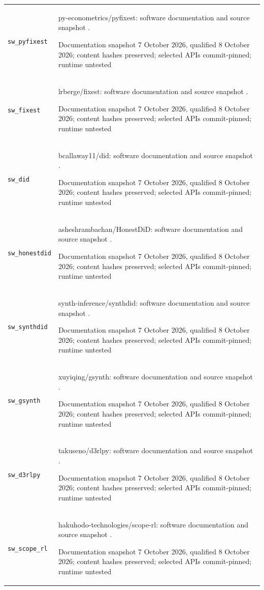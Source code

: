 \begin{longtable}{P{32mm}P{112mm}}
{\scriptsize\texttt{sw\_pyfixest}} & py-econometrics/pyfixest: software documentation and source snapshot \citep{sw_pyfixest}.\par Documentation snapshot 7 October 2026, qualified 8 October 2026; content hashes preserved; selected APIs commit-pinned; runtime untested\\
{\scriptsize\texttt{sw\_fixest}} & lrberge/fixest: software documentation and source snapshot \citep{sw_fixest}.\par Documentation snapshot 7 October 2026, qualified 8 October 2026; content hashes preserved; selected APIs commit-pinned; runtime untested\\
{\scriptsize\texttt{sw\_did}} & bcallaway11/did: software documentation and source snapshot \citep{sw_did}.\par Documentation snapshot 7 October 2026, qualified 8 October 2026; content hashes preserved; selected APIs commit-pinned; runtime untested\\
{\scriptsize\texttt{sw\_honestdid}} & asheshrambachan/HonestDiD: software documentation and source snapshot \citep{sw_honestdid}.\par Documentation snapshot 7 October 2026, qualified 8 October 2026; content hashes preserved; selected APIs commit-pinned; runtime untested\\
{\scriptsize\texttt{sw\_synthdid}} & synth-inference/synthdid: software documentation and source snapshot \citep{sw_synthdid}.\par Documentation snapshot 7 October 2026, qualified 8 October 2026; content hashes preserved; selected APIs commit-pinned; runtime untested\\
{\scriptsize\texttt{sw\_gsynth}} & xuyiqing/gsynth: software documentation and source snapshot \citep{sw_gsynth}.\par Documentation snapshot 7 October 2026, qualified 8 October 2026; content hashes preserved; selected APIs commit-pinned; runtime untested\\
{\scriptsize\texttt{sw\_d3rlpy}} & takuseno/d3rlpy: software documentation and source snapshot \citep{sw_d3rlpy}.\par Documentation snapshot 7 October 2026, qualified 8 October 2026; content hashes preserved; selected APIs commit-pinned; runtime untested\\
{\scriptsize\texttt{sw\_scope\_rl}} & hakuhodo-technologies/scope-rl: software documentation and source snapshot \citep{sw_scope_rl}.\par Documentation snapshot 7 October 2026, qualified 8 October 2026; content hashes preserved; selected APIs commit-pinned; runtime untested\\

\end{longtable}

